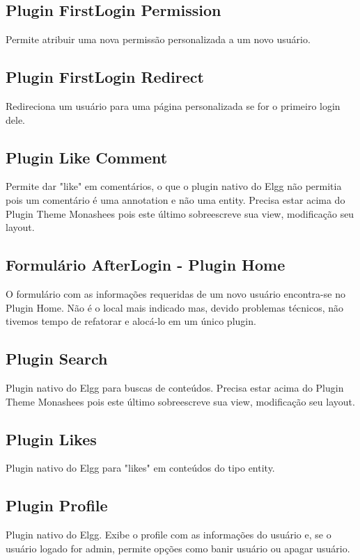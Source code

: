 \documentclass[12pt, letterpaper, onecolumn]{article}
\begin{document}
\subsection{Plugin FirstLogin Permission}
Permite atribuir uma nova permissão personalizada a um novo usuário.


\subsection{Plugin FirstLogin Redirect}
Redireciona um usuário para uma página personalizada se for o primeiro login dele.


\subsection{Plugin Like Comment}
Permite dar "like" em comentários, o que o plugin nativo do Elgg não permitia pois um comentário é uma annotation e não uma entity. Precisa estar acima do Plugin Theme Monashees pois este último sobreescreve sua view, modificação seu layout.


\subsection{Formulário AfterLogin - Plugin Home}
O formulário com as informações requeridas de um novo usuário encontra-se no Plugin Home. Não é o local mais indicado mas, devido problemas técnicos, não tivemos tempo de refatorar e alocá-lo em um único plugin.

\subsection{Plugin Search}
Plugin nativo do Elgg para buscas de conteúdos. Precisa estar acima do Plugin Theme Monashees pois este último sobreescreve sua view, modificação seu layout.

\subsection{Plugin Likes}
Plugin nativo do Elgg para "likes" em conteúdos do tipo entity.

\subsection{Plugin Profile}
Plugin nativo do Elgg. Exibe o profile com as informações do usuário e, se o usuário logado for admin, permite opções como banir usuário ou apagar usuário.
\end{document}

